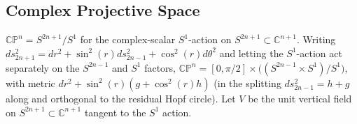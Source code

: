 \subsection{Complex Projective Space}

\begin{definition}
  \label{def:pet-ch4-cpn-submersion-setup}
  $\mathbb{CP}^n=S^{2n+1}/S^1$ for the complex-scalar $S^1$-action on
  $S^{2n+1}\subset\mathbb{C}^{n+1}$. Writing
  $ds_{2n+1}^2=dr^2+\sin^2(r)ds_{2n-1}^2+\cos^2(r)d\theta^2$ and letting the
  $S^1$-action act separately on the $S^{2n-1}$ and $S^1$ factors,
  $\mathbb{CP}^n=[0,\pi/2]\times\big((S^{2n-1}\times S^1)/S^1\big)$, with metric
  $dr^2+\sin^2(r)(g+\cos^2(r)h)$ (in the splitting $ds_{2n-1}^2=h+g$ along and
  orthogonal to the residual Hopf circle). Let $V$ be the unit vertical field
  on $S^{2n+1}\subset\mathbb{C}^{n+1}$ tangent to the $S^1$ action.
\end{definition}

